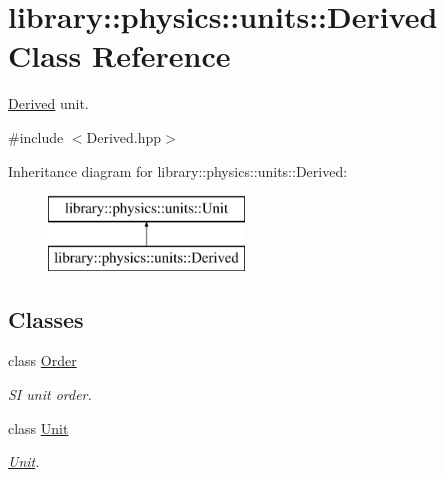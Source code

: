 \hypertarget{classlibrary_1_1physics_1_1units_1_1_derived}{}\section{library\+:\+:physics\+:\+:units\+:\+:Derived Class Reference}
\label{classlibrary_1_1physics_1_1units_1_1_derived}


\hyperlink{classlibrary_1_1physics_1_1units_1_1_derived}{Derived} unit.  




{\ttfamily \#include $<$Derived.\+hpp$>$}

Inheritance diagram for library\+:\+:physics\+:\+:units\+:\+:Derived\+:\begin{figure}[H]
\begin{center}
\leavevmode
\includegraphics[height=2.000000cm]{classlibrary_1_1physics_1_1units_1_1_derived}
\end{center}
\end{figure}
\subsection*{Classes}
\begin{DoxyCompactItemize}
\item 
class \hyperlink{classlibrary_1_1physics_1_1units_1_1_derived_1_1_order}{Order}
\begin{DoxyCompactList}\small\item\em SI unit order. \end{DoxyCompactList}\item 
class \hyperlink{classlibrary_1_1physics_1_1units_1_1_derived_1_1_unit}{Unit}
\begin{DoxyCompactList}\small\item\em \hyperlink{classlibrary_1_1physics_1_1units_1_1_derived_1_1_unit}{Unit}. \end{DoxyCompactList}\end{DoxyCompactItemize}
